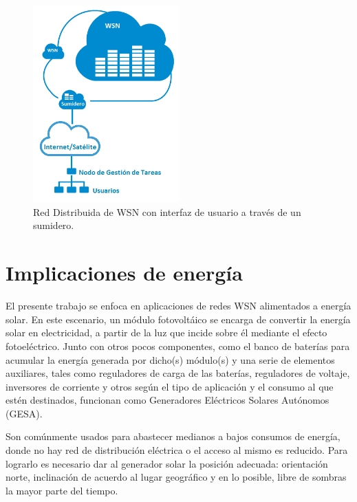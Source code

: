 \begin{figure}[h!]
	\centering
    \includegraphics[width=0.5\textwidth]{./Figures/RedDistribuida.png}
    	\caption{Red Distribuida de WSN con interfaz de usuario a través de un sumidero.}
	\label{fig:distrib}
\end{figure} 

\section{Implicaciones de energía}
\label{sec:energía}

El presente trabajo se enfoca en aplicaciones de redes WSN alimentados a energía solar. En este escenario, un módulo fotovoltáico se encarga de convertir la energía solar en electricidad, a partir de la luz que incide sobre él mediante el efecto fotoeléctrico. Junto con otros pocos componentes, como el banco de baterías para acumular la energía generada por dicho(s) módulo(s) y una serie de elementos auxiliares, tales como reguladores de carga de las baterías, reguladores de voltaje, inversores de corriente y otros según el tipo de aplicación y el consumo al que estén destinados, funcionan como Generadores Eléctricos Solares Autónomos (GESA).

Son comúnmente usados para abastecer medianos a bajos consumos de energía, donde no hay red de distribución eléctrica o el acceso al mismo es reducido. Para lograrlo es necesario dar al generador solar la posición adecuada: orientación norte, inclinación de acuerdo al lugar geográfico y en lo posible, libre de sombras la mayor parte del tiempo.

